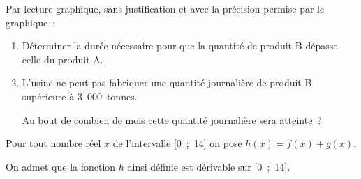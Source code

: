 \medbreak
Par lecture graphique, sans justification et avec la précision permise par le graphique~:
\medbreak
\begin{enumerate}
     \item Déterminer la durée nécessaire pour que la quantité de produit B dépasse celle du produit A.
     \item L'usine ne peut pas fabriquer une quantité journalière de produit B supérieure à 3~000~tonnes.
     \par
     Au bout de combien de mois cette quantité journalière sera atteinte~?
\end{enumerate}
\bigbreak
{}
\medbreak
Pour tout nombre réel $x$ de l'intervalle [0~;~14] on pose $h(x) = f(x) + g(x)$.
\par
On admet que la fonction $h$ ainsi définie est dérivable sur [0~;~14].
\medbreak
